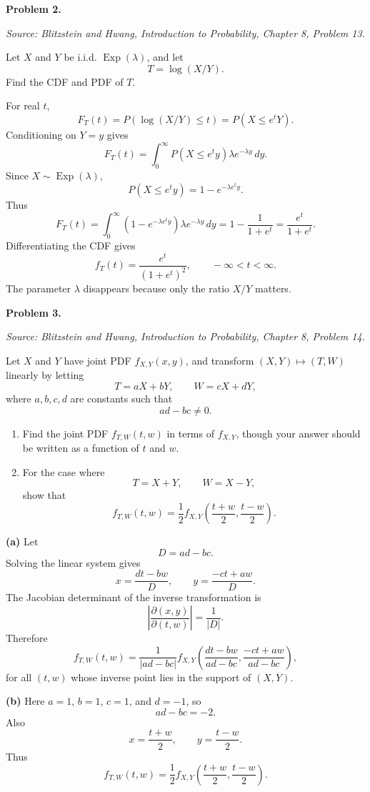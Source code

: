 \documentclass[11pt]{article}
\newcommand{\dd}{\,d}
\newcommand{\source}[2]{%
    \vspace{0.15cm}
    {\small\textit{Source: Blitzstein and Hwang, \textit{Introduction to Probability}, Chapter #1, Problem #2.}}
}
\begin{document}

\begin{problemheader}
\textbf{Problem 2. }
\end{problemheader}
\source{8}{13}

Let $X$ and $Y$ be i.i.d. $\operatorname{Exp}(\lambda)$, and let
\[
T=\log(X/Y).
\]
Find the CDF and PDF of $T$.

\begin{solutionbox}
For real $t$,
\[
F_T(t)=P\!\left(\log(X/Y)\le t\right)=P(X\le e^tY).
\]
Conditioning on $Y=y$ gives
\[
F_T(t)=\int_0^\infty P(X\le e^t y)\lambda e^{-\lambda y}\dd y.
\]
Since $X\sim\operatorname{Exp}(\lambda)$,
\[
P(X\le e^t y)=1-e^{-\lambda e^t y}.
\]
Thus
\[
F_T(t)=\int_0^\infty \left(1-e^{-\lambda e^t y}\right)\lambda e^{-\lambda y}\dd y
=1-\frac{1}{1+e^t}
=\frac{e^t}{1+e^t}.
\]
Differentiating the CDF gives
\[
f_T(t)=\frac{e^t}{(1+e^t)^2},
\qquad -\infty<t<\infty.
\]
The parameter $\lambda$ disappears because only the ratio $X/Y$ matters.

 
\end{solutionbox}
\newpage


\begin{problemheader}
\textbf{Problem 3.  }
\end{problemheader}
\source{8}{14}

Let $X$ and $Y$ have joint PDF $f_{X,Y}(x,y)$, and transform $(X,Y)\mapsto (T,W)$ linearly by letting
\[
T=aX+bY,
\qquad
W=cX+dY,
\]
where $a,b,c,d$ are constants such that
\[
ad-bc\ne0.
\]

\begin{enumerate}[label=(\alph*), leftmargin=*]
    \item Find the joint PDF $f_{T,W}(t,w)$ in terms of $f_{X,Y}$, though your answer should be written as a function of $t$ and $w$.

    \item For the case where
    \[
    T=X+Y,
    \qquad
    W=X-Y,
    \]
    show that
    \[
    f_{T,W}(t,w)
    =
    \frac12
    f_{X,Y}\left(\frac{t+w}{2},\frac{t-w}{2}\right).
    \]
\end{enumerate}

\begin{solutionbox}
\textbf{(a)} Let
\[
D=ad-bc.
\]
Solving the linear system gives
\[
x=\frac{dt-bw}{D},
\qquad
 y=\frac{-ct+aw}{D}.
\]
The Jacobian determinant of the inverse transformation is
\[
\left|\frac{\partial(x,y)}{\partial(t,w)}\right|=\frac{1}{|D|}.
\]
Therefore
\[
f_{T,W}(t,w)
=
\frac{1}{|ad-bc|}
 f_{X,Y}\left(\frac{dt-bw}{ad-bc},\frac{-ct+aw}{ad-bc}\right),
\]
for all $(t,w)$ whose inverse point lies in the support of $(X,Y)$.

 

\textbf{(b)} Here $a=1$, $b=1$, $c=1$, and $d=-1$, so
\[
ad-bc=-2.
\]
Also
\[
x=\frac{t+w}{2},
\qquad
 y=\frac{t-w}{2}.
\]
Thus
\[
f_{T,W}(t,w)
=
\frac12 f_{X,Y}\left(\frac{t+w}{2},\frac{t-w}{2}\right).
\]

 
\end{solutionbox}
\newpage
\end{document}

